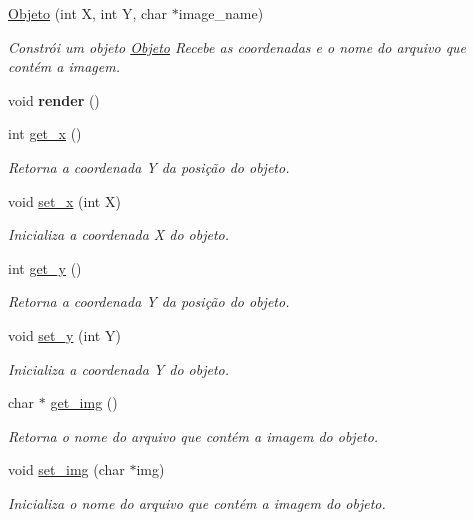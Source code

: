 \begin{DoxyCompactItemize}
\item 
\hyperlink{classObjeto_a9c9927529170f4d17fd926c83266c7a8}{Objeto} (int X, int Y, char $\ast$image\+\_\+name)
\begin{DoxyCompactList}\small\item\em Constrói um objeto \hyperlink{classObjeto}{Objeto} Recebe as coordenadas e o nome do arquivo que contém a imagem. \end{DoxyCompactList}\item 
void {\bfseries render} ()\hypertarget{classObjeto_a294bd02cea8cbee25f423f37fac91b2a}{}\label{classObjeto_a294bd02cea8cbee25f423f37fac91b2a}

\item 
int \hyperlink{classObjeto_adb11196ab4be9f1cb16d1fdda7b9ae3e}{get\+\_\+x} ()
\begin{DoxyCompactList}\small\item\em Retorna a coordenada Y da posição do objeto. \end{DoxyCompactList}\item 
void \hyperlink{classObjeto_a8fbb753ea08c63f829d647456ad4815a}{set\+\_\+x} (int X)
\begin{DoxyCompactList}\small\item\em Inicializa a coordenada X do objeto. \end{DoxyCompactList}\item 
int \hyperlink{classObjeto_aa20f6660f47e6e45c6a2cde3fede4892}{get\+\_\+y} ()
\begin{DoxyCompactList}\small\item\em Retorna a coordenada Y da posição do objeto. \end{DoxyCompactList}\item 
void \hyperlink{classObjeto_a621ce64fb94c2ef5a7828fd8fbde7130}{set\+\_\+y} (int Y)
\begin{DoxyCompactList}\small\item\em Inicializa a coordenada Y do objeto. \end{DoxyCompactList}\item 
char $\ast$ \hyperlink{classObjeto_ac10714477e91925fcdd59a7a98f55fea}{get\+\_\+img} ()
\begin{DoxyCompactList}\small\item\em Retorna o nome do arquivo que contém a imagem do objeto. \end{DoxyCompactList}\item 
void \hyperlink{classObjeto_aebe9ae03165a9e25fa4677512ea0b6d1}{set\+\_\+img} (char $\ast$img)
\begin{DoxyCompactList}\small\item\em Inicializa o nome do arquivo que contém a imagem do objeto. \end{DoxyCompactList}\end{DoxyCompactItemize}
